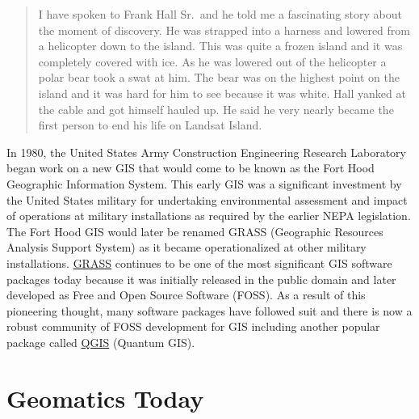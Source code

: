 \documentclass[
]{book}
\begin{document}
\begin{quote}
I have spoken to Frank Hall Sr.~and he told me a fascinating story about the moment of discovery. He was strapped into a harness and lowered from a helicopter down to the island. This was quite a frozen island and it was completely covered with ice. As he was lowered out of the helicopter a polar bear took a swat at him. The bear was on the highest point on the island and it was hard for him to see because it was white. Hall yanked at the cable and got himself hauled up. He said he very nearly became the first person to end his life on Landsat Island.
\end{quote}

In 1980, the United States Army Construction Engineering Research Laboratory began work on a new GIS that would come to be known as the Fort Hood Geographic Information System. This early GIS was a significant investment by the United States military for undertaking environmental assessment and impact of operations at military installations as required by the earlier NEPA legislation. The Fort Hood GIS would later be renamed GRASS (Geographic Resources Analysis Support System) as it became operationalized at other military installations. \href{https://github.com/OSGeo/grass}{GRASS} continues to be one of the most significant GIS software packages today because it was initially released in the public domain and later developed as Free and Open Source Software (FOSS). As a result of this pioneering thought, many software packages have followed suit and there is now a robust community of FOSS development for GIS including another popular package called \href{https://github.com/qgis/QGIS}{QGIS} (Quantum GIS).

\hypertarget{geomatics-today}{%
\section{Geomatics Today}\label{geomatics-today}}
\end{document}
